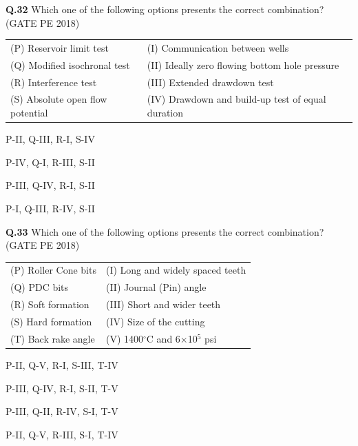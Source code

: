 \documentclass[journal,12pt,onecolumn]{IEEEtran}
\theoremstyle{remark}
\begin{document}
\pagebreak

\noindent\textbf{Q.32} Which one of the following options presents the correct combination? \hfill (GATE PE 2018)

\vspace{0.3cm}

\begin{tabular}{ll}
(P) Reservoir limit test         & (I) Communication between wells \\
(Q) Modified isochronal test     & (II) Ideally zero flowing bottom hole pressure \\
(R) Interference test            & (III) Extended drawdown test \\
(S) Absolute open flow potential & (IV) Drawdown and build-up test of equal duration\\ 
\end{tabular}


\begin{enumerate}
\begin{multicols}{2}
	\item P-II, Q-III, R-I, S-IV \item P-IV, Q-I, R-III, S-II 
	\item P-III, Q-IV, R-I, S-II \item P-I, Q-III, R-IV, S-II 
\end{multicols}
\end{enumerate}

\noindent\textbf{Q.33} Which one of the following options presents the correct combination? \hfill (GATE PE 2018)

\vspace{0.3cm}

\begin{tabular}{ll}
(P) Roller Cone bits    & (I) Long and widely spaced teeth \\
(Q) PDC bits            & (II) Journal (Pin) angle \\
(R) Soft formation      & (III) Short and wider teeth \\
(S) Hard formation      & (IV) Size of the cutting \\
(T) Back rake angle     & (V) 1400$^\circ$C and 6$\times$10$^5$ psi \\
\end{tabular}



\begin{enumerate} 
\begin{multicols}{2}
\item P-II, Q-V, R-I, S-III, T-IV \item P-III, Q-IV, R-I, S-II, T-V \\
\item P-III, Q-II, R-IV, S-I, T-V \item P-II, Q-V, R-III, S-I, T-IV \\
\end{multicols}
\end{enumerate}
\end{document}
